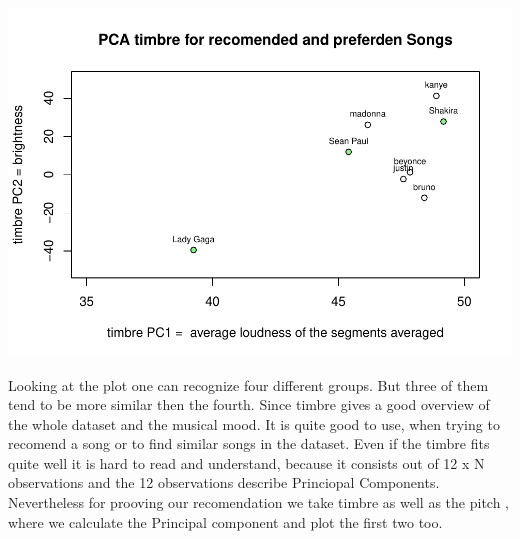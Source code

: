 \documentclass[]{article}
\begin{document}
\includegraphics{Project2_files/figure-latex/PCATimbre-1.pdf}

Looking at the plot one can recognize four different groups. But three
of them tend to be more similar then the fourth. Since timbre gives a
good overview of the whole dataset and the musical mood. It is quite
good to use, when trying to recomend a song or to find similar songs in
the dataset. Even if the timbre fits quite well it is hard to read and
understand, because it consists out of 12 x N observations and the 12
observations describe Princiopal Components. Nevertheless for prooving
our recomendation we take timbre as well as the pitch , where we
calculate the Principal component and plot the first two too.
\end{document}
